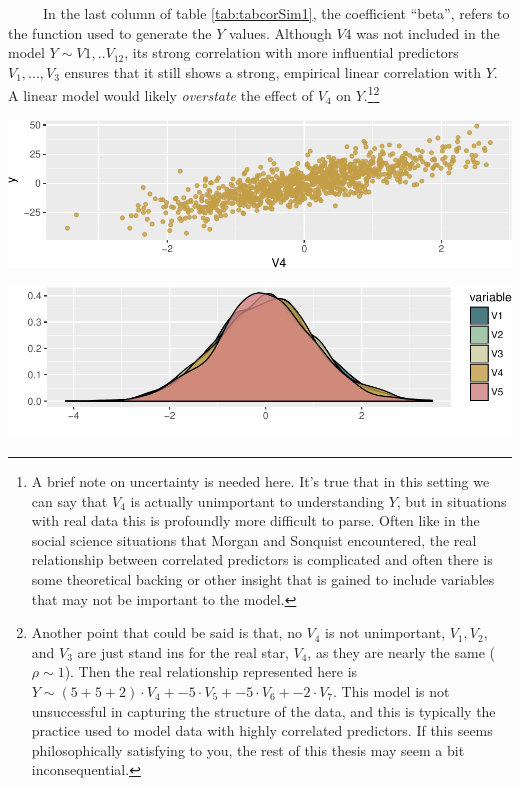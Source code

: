 \documentclass[12pt,twoside]{reedthesis}
\let\origfigure\figure
\let\endorigfigure\endfigure
\renewenvironment{figure}[1][2] {
    \expandafter\origfigure\expandafter[H]
} {
    \endorigfigure
}
\begin{document}
  ~~~~~In the last column of table \ref{tab:tabcorSim1}, the coefficient
  ``beta'', refers to the function used to generate the \(Y\) values.
  Although \(V4\) was not included in the model \(Y \sim V1,..V_{12}\),
  its strong correlation with more influential predictors \(V_1,...,V_3\)
  ensures that it still shows a strong, empirical linear correlation with
  \(Y\). A linear model would likely \emph{overstate} the effect of
  \(V_4\) on \(Y\).\footnote{A brief note on uncertainty is needed here.
    It's true that in this setting we can say that \(V_4\) is actually
    unimportant to understanding \(Y\), but in situations with real data
    this is profoundly more difficult to parse. Often like in the social
    science situations that Morgan and Sonquist encountered, the real
    relationship between correlated predictors is complicated and often
    there is some theoretical backing or other insight that is gained to
    include variables that may not be important to the model.}\footnote{Another
    point that could be said is that, no \(V_4\) is not unimportant,
    \(V_1, V_2,\) and \(V_3\) are just stand ins for the real star,
    \(V_4\), as they are nearly the same (\(\rho \sim 1\)). Then the real
    relationship represented here is
    \(Y \sim (5 + 5 + 2) \cdot V_4 + -5 \cdot V_5 + -5 \cdot V_6 + -2 \cdot V_7\).
    This model is not unsuccessful in capturing the structure of the data,
    and this is typically the practice used to model data with highly
    correlated predictors. If this seems philosophically satisfying to
    you, the rest of this thesis may seem a bit inconsequential.}
  
  \begin{figure}[htbp]
  \centering
  \includegraphics{Thesis_files/figure-latex/figdenv4y-1.pdf}
  \caption{\label{fig:figdenv4y}Relation between V4 and Y. This relation has
  empirical linear correlation = .789}
  \end{figure}
  
  \begin{figure}[htbp]
  \centering
  \includegraphics{Thesis_files/figure-latex/unnamed-chunk-14-1.pdf}
  \caption{\label{fig:unnamed-chunk-14}\label{fig:figdenv1v5}Empirical
  densities for V1 through V4}
  \end{figure}
  
\end{document}

